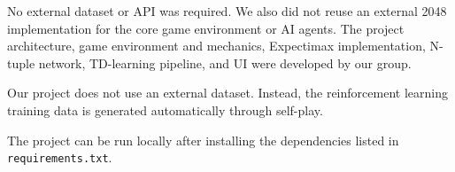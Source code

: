 \documentclass[11pt]{article}
\begin{document}
No external dataset or API was required. We also did not reuse an external 2048 implementation for the core game environment or AI agents. The project architecture, game environment and mechanics, Expectimax implementation, N-tuple network, TD-learning pipeline, and UI were developed by our group.

Our project does not use an external dataset. Instead, the reinforcement learning training data is generated automatically through self-play.

The project can be run locally after installing the dependencies listed in \texttt{requirements.txt}.
\endgroup
\end{document}
